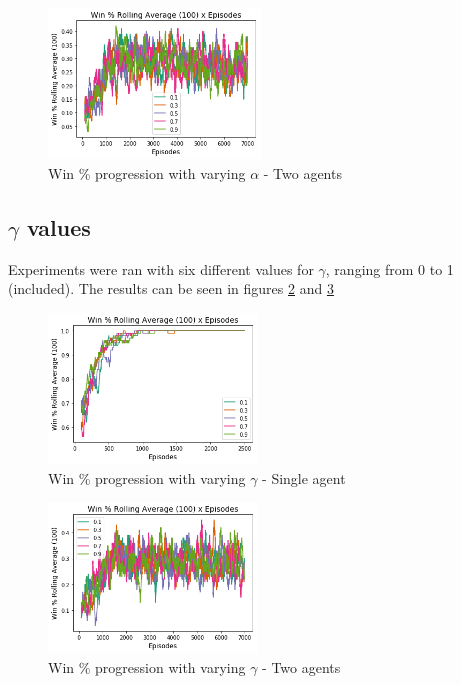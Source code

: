\documentclass[11pt]{article}
\begin{document}
        \begin{figure}[h]
            \includegraphics[height=4cm]{Images/exp_3/2_win_percent.png}
            \caption{Win \% progression with varying $\alpha$ - Two agents}
            \label{fig:exp3:win_percent_two}
        \end{figure}


    \subsection{$\gamma$ values}
        Experiments were ran with six different values for $\gamma$, ranging from 0 to 1 (included). The results can be seen in figures \ref{fig:exp4:win_percent} and \ref{fig:exp4:win_percent_two}
        \begin{figure}[h]
            \includegraphics[height=4cm]{Images/exp_4/1_win_percent.png}
            \caption{Win \% progression with varying $\gamma$ - Single agent}
            \label{fig:exp4:win_percent}
        \end{figure}

        \begin{figure}[h]
            \includegraphics[height=4cm]{Images/exp_4/2_win_percent.png}
            \caption{Win \% progression with varying $\gamma$ - Two agents}
            \label{fig:exp4:win_percent_two}
        \end{figure}
\end{document}
